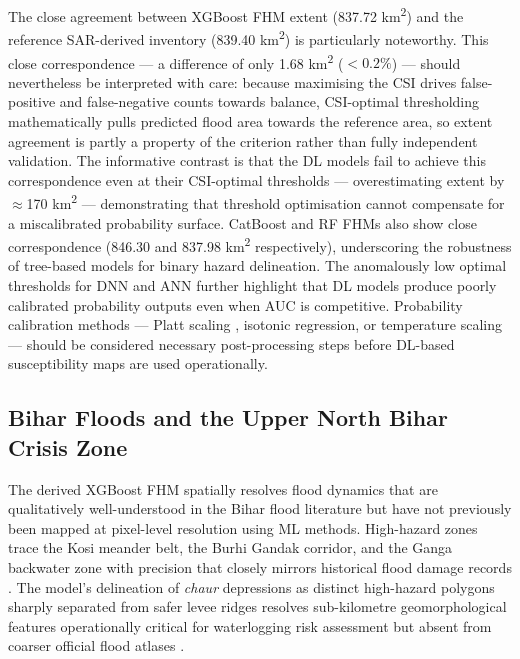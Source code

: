 \documentclass[12pt, a4paper]{article}
\begin{document}
The close agreement between XGBoost FHM extent (837.72 km\textsuperscript{2}) and the reference SAR-derived inventory (839.40 km\textsuperscript{2}) is particularly noteworthy. This close correspondence --- a difference of only 1.68 km\textsuperscript{2} ($< 0.2\%$) --- should nevertheless be interpreted with care: because maximising the CSI drives false-positive and false-negative counts towards balance, CSI-optimal thresholding mathematically pulls predicted flood area towards the reference area, so extent agreement is partly a property of the criterion rather than fully independent validation. The informative contrast is that the DL models fail to achieve this correspondence even at their CSI-optimal thresholds --- overestimating extent by $\approx$170 km\textsuperscript{2} --- demonstrating that threshold optimisation cannot compensate for a miscalibrated probability surface. CatBoost and RF FHMs also show close correspondence (846.30 and 837.98 km\textsuperscript{2} respectively), underscoring the robustness of tree-based models for binary hazard delineation. The anomalously low optimal thresholds for DNN and ANN further highlight that DL models produce poorly calibrated probability outputs even when AUC is competitive. Probability calibration methods --- Platt scaling \citep{platt1999}, isotonic regression, or temperature scaling --- should be considered necessary post-processing steps before DL-based susceptibility maps are used operationally.

\subsection{Bihar Floods and the Upper North Bihar Crisis Zone}

The derived XGBoost FHM spatially resolves flood dynamics that are qualitatively well-understood in the Bihar flood literature but have not previously been mapped at pixel-level resolution using ML methods. High-hazard zones trace the Kosi meander belt, the Burhi Gandak corridor, and the Ganga backwater zone with precision that closely mirrors historical flood damage records \citep{bhuvan2010, tatatrusts2024, sinha2008, Arora2025SciRep, Arora2022SERRA}. The model's delineation of \textit{chaur} depressions as distinct high-hazard polygons sharply separated from safer levee ridges resolves sub-kilometre geomorphological features operationally critical for waterlogging risk assessment but absent from coarser official flood atlases \citep{bhuvan2010}.
\end{document}
